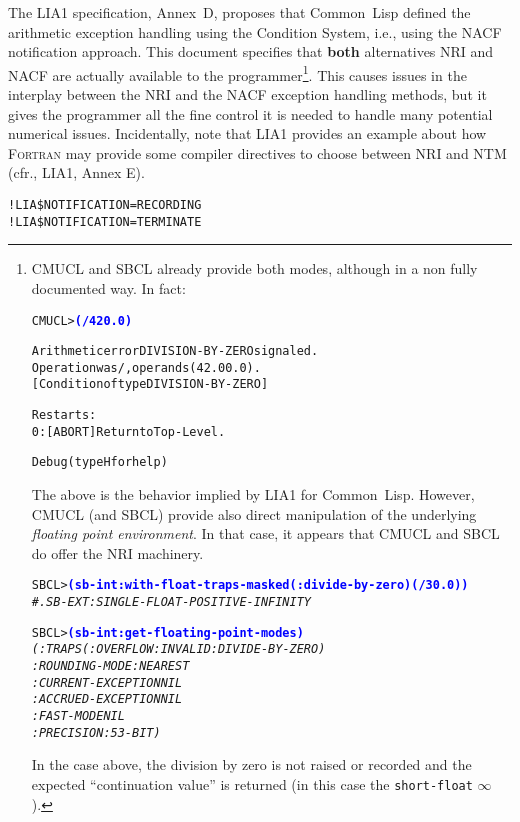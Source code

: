 \documentclass[10pt,fleqn]{article}
\newcommand{\CL}{\textsf{Common~Lisp}}
\newcommand{\CMUCL}{\textsf{CMUCL}}
\newcommand{\SBCL}{\textsf{SBCL}}
\newcommand{\Fortran}{\textsc{\textsf{Fortran}}}
\newcommand{\code}[1]{\texttt{#1}}
\newcommand{\codeprompt}[1]{\textcolor{blue}{\textbf{#1}}}
\begin{document}
The LIA1 specification, Annex~D, proposes that \CL{} defined the
arithmetic exception handling using the Condition System, i.e., using
the NACF notification approach.  This document specifies that
\textbf{both} alternatives NRI and NACF are actually available to the
programmer\footnote{\CMUCL{} and \SBCL{} already provide
  both modes, although in a non fully documented way. In fact:

\begin{alltt}
CMUCL> \codeprompt{(/ 42 0.0)}

Arithmetic error DIVISION-BY-ZERO signaled.
Operation was /, operands (42.0 0.0).
   [Condition of type DIVISION-BY-ZERO]

Restarts:
  0: [ABORT] Return to Top-Level.

Debug  (type H for help)
\end{alltt}
  The above is the behavior implied by LIA1 for \CL{}.  However,
  \CMUCL{} (and \SBCL{}) provide also direct manipulation of the
  underlying \emph{floating point environment}.  In that case, it
  appears that \CMUCL{} and \SBCL{} do offer the NRI machinery.
\begin{alltt}
SBCL> \codeprompt{(sb-int:with-float-traps-masked (:divide-by-zero) (/ 3 0.0))}
\textit{\#.SB-EXT:SINGLE-FLOAT-POSITIVE-INFINITY}

SBCL> \codeprompt{(sb-int:get-floating-point-modes)}\\
\textit{(:TRAPS (:OVERFLOW :INVALID :DIVIDE-BY-ZERO)\\
  :ROUNDING-MODE :NEAREST\\
  :CURRENT-EXCEPTION NIL\\
  :ACCRUED-EXCEPTION NIL\\
  :FAST-MODE NIL\\
  :PRECISION :53-BIT)}
\end{alltt}
In the case above, the division by zero is not raised or recorded and
the expected ``continuation value'' is returned (in this case the
\code{short-float} $\infty$).
}.
This causes issues in the interplay between the NRI and the NACF
exception handling methods, but it gives the programmer all the fine
control it is needed to handle many potential numerical
issues. Incidentally, note that LIA1 provides an example about how
\Fortran{} may provide some compiler directives to choose between NRI
and NTM (cfr., LIA1, Annex E).
\begin{alltt}
!LIA\$  NOTIFICATION=RECORDING
!LIA\$  NOTIFICATION=TERMINATE
\end{alltt}
\end{document}
